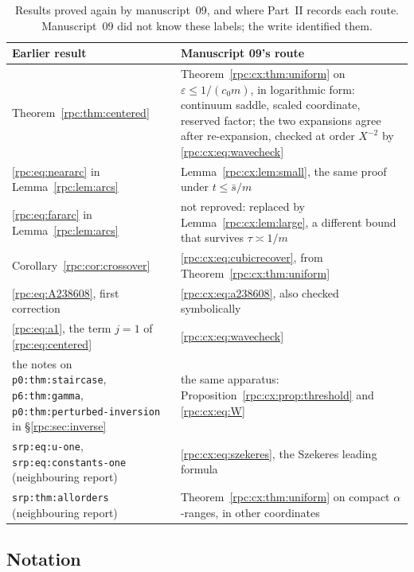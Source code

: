 \documentclass[11pt]{article}
\theoremstyle{definition}
\theoremstyle{remark}
\numberwithin{equation}{section}
\begin{document}
\begin{table}[htbp]
\centering\small
\renewcommand{\arraystretch}{1.12}
\begin{tabular}{@{}>{\raggedright\arraybackslash}p{}>{\raggedright\arraybackslash}p{}@{}}
\toprule
Earlier result & Manuscript 09's route\\
\midrule
Theorem~\ref{rpc:thm:centered} &
Theorem~\ref{rpc:cx:thm:uniform} on $\varepsilon\le1/(c_0m)$, in
logarithmic form: continuum saddle, scaled coordinate, reserved factor;
the two expansions agree after re-expansion, checked at order $X^{-2}$ by
\eqref{rpc:cx:eq:wavecheck}\\
\eqref{rpc:eq:neararc} in Lemma~\ref{rpc:lem:arcs} &
Lemma~\ref{rpc:cx:lem:small}, the same proof under $t\le\bar s/m$\\
\eqref{rpc:eq:fararc} in Lemma~\ref{rpc:lem:arcs} &
not reproved: replaced by Lemma~\ref{rpc:cx:lem:large}, a different bound
that survives $\tau\asymp1/m$\\
Corollary~\ref{rpc:cor:crossover} &
\eqref{rpc:cx:eq:cubicrecover}, from Theorem~\ref{rpc:cx:thm:uniform}\\
\eqref{rpc:eq:A238608}, first correction &
\eqref{rpc:cx:eq:a238608}, also checked symbolically\\
\eqref{rpc:eq:a1}, the term $j=1$ of \eqref{rpc:eq:centered} &
\eqref{rpc:cx:eq:wavecheck}\\
the notes on \texttt{p0:thm:staircase}, \texttt{p6:thm:gamma},
\texttt{p0:thm:perturbed-inversion} in \S\ref{rpc:sec:inverse} &
the same apparatus: Proposition~\ref{rpc:cx:prop:threshold} and
\eqref{rpc:cx:eq:W}\\
\texttt{srp:eq:u-one}, \texttt{srp:eq:constants-one} (neighbouring report) &
\eqref{rpc:cx:eq:szekeres}, the Szekeres leading formula\\
\texttt{srp:thm:allorders} (neighbouring report) &
Theorem~\ref{rpc:cx:thm:uniform} on compact $\alpha$-ranges, in other
coordinates\\
\bottomrule
\end{tabular}
\caption{Results proved again by manuscript~09, and where Part~II records
each route. Manuscript~09 did not know these labels; the write identified
them.}
\label{rpc:cx:tab:routes}
\end{table}

\subsection{Notation}
\label{rpc:cx:sec:notation}
\end{document}
